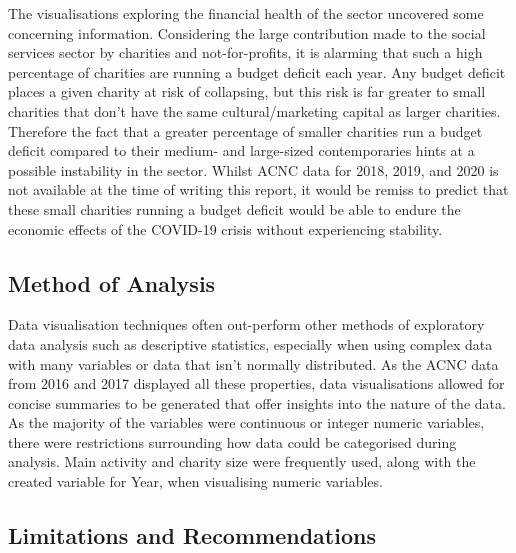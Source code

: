 \documentclass[
  11pt,
]{article}
\begin{document}
The visualisations exploring the financial health of the sector uncovered some concerning information. Considering the large contribution made to the social services sector by charities and not-for-profits, it is alarming that such a high percentage of charities are running a budget deficit each year. Any budget deficit places a given charity at risk of collapsing, but this risk is far greater to small charities that don't have the same cultural/marketing capital as larger charities. Therefore the fact that a greater percentage of smaller charities run a budget deficit compared to their medium- and large-sized contemporaries hints at a possible instability in the sector. Whilst ACNC data for 2018, 2019, and 2020 is not available at the time of writing this report, it would be remiss to predict that these small charities running a budget deficit would be able to endure the economic effects of the COVID-19 crisis without experiencing stability.

\hypertarget{method-of-analysis}{%
\subsection{Method of Analysis}\label{method-of-analysis}}

Data visualisation techniques often out-perform other methods of exploratory data analysis such as descriptive statistics, especially when using complex data with many variables or data that isn't normally distributed. As the ACNC data from 2016 and 2017 displayed all these properties, data visualisations allowed for concise summaries to be generated that offer insights into the nature of the data.\\
As the majority of the variables were continuous or integer numeric variables, there were restrictions surrounding how data could be categorised during analysis. Main activity and charity size were frequently used, along with the created variable for Year, when visualising numeric variables.

\hypertarget{limitations-and-recommendations}{%
\subsection{Limitations and Recommendations}\label{limitations-and-recommendations}}
\end{document}

